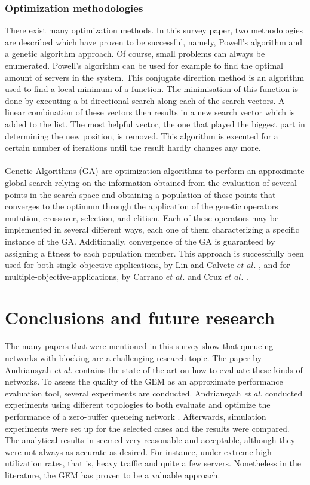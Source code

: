 \documentclass[twoside]{article}
\begin{document}
\begin{multicols}{2}
\subsubsection{Optimization methodologies}
There exist many optimization methods. In this survey paper, two methodologies are described which have proven to be successful, namely, Powell’s algorithm \cite{powel} and a genetic algorithm approach. Of course, small problems can always be enumerated.
Powell's algorithm can be used for example to find the optimal amount of servers in the system. This conjugate direction method is an algorithm used to find a local minimum of a function. The minimisation of this function is done by executing a bi-directional search along each of the search vectors. A linear combination of these vectors then results in a new search vector which is added to the list. The most helpful vector, the one that played the biggest part in determining the new position, is removed. This algorithm is executed for a certain number of iterations until the result hardly changes any more.
\\\\
Genetic Algorithms (GA) are optimization algorithms to perform an approximate global search relying on the information obtained from the evaluation of several points in the search space and obtaining a population of these points that converges to the optimum through the application of the genetic operators mutation, crossover, selection, and elitism. Each of these operators may be implemented in several different ways, each one of them characterizing a specific instance of the GA. Additionally, convergence of the GA is guaranteed by assigning a fitness to each population member. This approach is successfully been used for both single-objective applications, by Lin \cite{single1} and Calvete $et$ $al.$ \cite{single2}, and for multiple-objective-applications, by Carrano $et$ $al.$ \cite{multi1} and Cruz $et$ $al.$ \cite{article11}.
\section{\textbf{Conclusions and future research}}
The many papers that were mentioned in this survey show that queueing networks with blocking are a challenging research topic. The paper by Andriansyah \textit{et al.} \cite{own} contains the state-of-the-art on how to evaluate these kinds of networks.
To assess the quality of the GEM as an approximate performance evaluation tool, several experiments are conducted. Andriansyah \textit{et al.} conducted experiments using different topologies to both evaluate and optimize the performance of a zero-buffer queueing network \cite{own}.
Afterwards, simulation experiments were set up for the selected cases and the results were compared. The analytical results in \cite{own} seemed very reasonable and acceptable, although they were not always as accurate as desired. For instance, under extreme high utilization rates, that is, heavy traffic and quite a few servers. Nonetheless in the literature, the GEM has proven to be a valuable approach.

\end{multicols}
\end{document}
